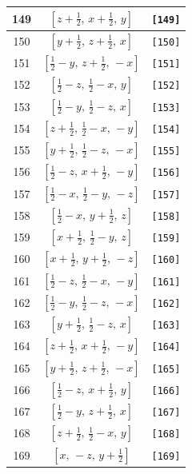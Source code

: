 \documentclass[fleqn,8pt]{jsarticle}
\begin{document}
\begin{longtable}{ccc}
149 & $\left[ z + \frac{1}{2},\, x + \frac{1}{2},\, y \right]$ & {\tt [149]} \\ \hline
150 & $\left[ y + \frac{1}{2},\, z + \frac{1}{2},\, x \right]$ & {\tt [150]} \\ \hline
151 & $\left[ \frac{1}{2} - y,\, z + \frac{1}{2},\, - x \right]$ & {\tt [151]} \\ \hline
152 & $\left[ \frac{1}{2} - z,\, \frac{1}{2} - x,\, y \right]$ & {\tt [152]} \\ \hline
153 & $\left[ \frac{1}{2} - y,\, \frac{1}{2} - z,\, x \right]$ & {\tt [153]} \\ \hline
154 & $\left[ z + \frac{1}{2},\, \frac{1}{2} - x,\, - y \right]$ & {\tt [154]} \\ \hline
155 & $\left[ y + \frac{1}{2},\, \frac{1}{2} - z,\, - x \right]$ & {\tt [155]} \\ \hline
156 & $\left[ \frac{1}{2} - z,\, x + \frac{1}{2},\, - y \right]$ & {\tt [156]} \\ \hline
157 & $\left[ \frac{1}{2} - x,\, \frac{1}{2} - y,\, - z \right]$ & {\tt [157]} \\ \hline
158 & $\left[ \frac{1}{2} - x,\, y + \frac{1}{2},\, z \right]$ & {\tt [158]} \\ \hline
159 & $\left[ x + \frac{1}{2},\, \frac{1}{2} - y,\, z \right]$ & {\tt [159]} \\ \hline
160 & $\left[ x + \frac{1}{2},\, y + \frac{1}{2},\, - z \right]$ & {\tt [160]} \\ \hline
161 & $\left[ \frac{1}{2} - z,\, \frac{1}{2} - x,\, - y \right]$ & {\tt [161]} \\ \hline
162 & $\left[ \frac{1}{2} - y,\, \frac{1}{2} - z,\, - x \right]$ & {\tt [162]} \\ \hline
163 & $\left[ y + \frac{1}{2},\, \frac{1}{2} - z,\, x \right]$ & {\tt [163]} \\ \hline
164 & $\left[ z + \frac{1}{2},\, x + \frac{1}{2},\, - y \right]$ & {\tt [164]} \\ \hline
165 & $\left[ y + \frac{1}{2},\, z + \frac{1}{2},\, - x \right]$ & {\tt [165]} \\ \hline
166 & $\left[ \frac{1}{2} - z,\, x + \frac{1}{2},\, y \right]$ & {\tt [166]} \\ \hline
167 & $\left[ \frac{1}{2} - y,\, z + \frac{1}{2},\, x \right]$ & {\tt [167]} \\ \hline
168 & $\left[ z + \frac{1}{2},\, \frac{1}{2} - x,\, y \right]$ & {\tt [168]} \\ \hline
169 & $\left[ x,\, - z,\, y + \frac{1}{2} \right]$ & {\tt [169]} \\ \hline

\end{longtable}
\end{document}
